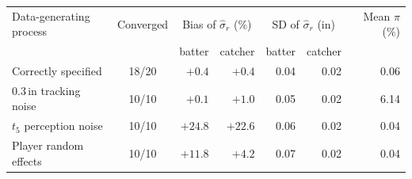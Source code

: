 \begin{tabular}{lcrrrrr}
\toprule
Data-generating process & Converged & \multicolumn{2}{c}{Bias of $\hat\sigma_r$ (\%)} & \multicolumn{2}{c}{SD of $\hat\sigma_r$ (in)} & Mean $\hat\pi$ (\%) \\
& & batter & catcher & batter & catcher & \\
\midrule
Correctly specified & 18/20 & $+0.4$ & $+0.4$ & 0.04 & 0.02 & 0.06 \\
0.3\,in tracking noise & 10/10 & $+0.1$ & $+1.0$ & 0.05 & 0.02 & 6.14 \\
$t_5$ perception noise & 10/10 & $+24.8$ & $+22.6$ & 0.06 & 0.02 & 0.04 \\
Player random effects & 10/10 & $+11.8$ & $+4.2$ & 0.07 & 0.02 & 0.04 \\
\bottomrule
\end{tabular}
